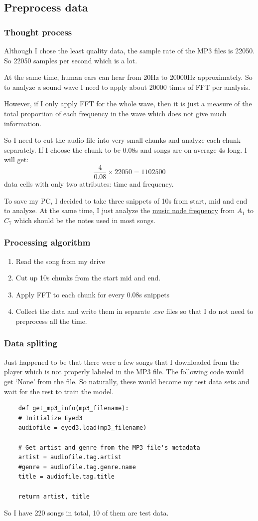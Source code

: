 \documentclass[letterpaper,12pt]{article}
\begin{document}
\subsection{Preprocess data}
\subsubsection{Thought process}
Although I chose the least quality data, the sample rate of the MP3 files is 22050. So 22050 samples per second which is a lot.

At the same time, human ears can hear from 20Hz to 20000Hz approximately. So to analyze a sound wave I need to apply about 20000 times of FFT per analysis.

However, if I only apply FFT for the whole wave, then it is just a measure of the total proportion of each frequency in the wave which does not give much information.

So I need to cut the audio file into very small chunks and analyze each chunk separately. If I choose the chunk to be 0.08s and songs are on average 4s long. I will get:
\[\frac{4}{0.08}\times 22050 = 1102500\]
data cells with only two attributes: time and frequency.

To save my PC, I decided to take three snippets of 10s from start, mid and end to analyze. At the same time, I just analyze the \href{https://pages.mtu.edu/~suits/notefreqs.html}{music node frequency} from $A_1$ to $C_7$ which should be the notes used in most songs.

\subsubsection{Processing algorithm}
\begin{enumerate}
    \item Read the song from my drive
    \item Cut up 10s chunks from the start mid and end.
    \item Apply FFT to each chunk for every 0.08s snippets
    \item Collect the data and write them in separate $.csv$ files so that I do not need to preprocess all the time.
\end{enumerate}

\subsubsection{Data spliting}
Just happened to be that there were a few songs that I downloaded from the player which is not properly labeled in the MP3 file. The following code would get `None' from the file. So naturally, these would become my test data sets and wait for the rest to train the model.
\begin{lstlisting}
    def get_mp3_info(mp3_filename):
    # Initialize Eyed3
    audiofile = eyed3.load(mp3_filename)

    # Get artist and genre from the MP3 file's metadata
    artist = audiofile.tag.artist
    #genre = audiofile.tag.genre.name
    title = audiofile.tag.title

    return artist, title
\end{lstlisting}
So I have 220 songs in total, 10 of them are test data.
\end{document}
